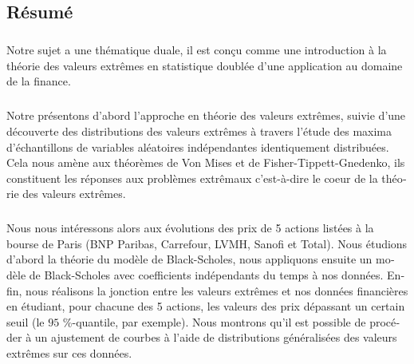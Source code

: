 \begin{otherlanguage}{french}
\cleardoublepage
\chapter*{Résumé}
\bigskip
\paragraph{}
Notre sujet a une thématique duale, il est con\c cu comme une introduction à la théorie des valeurs extrêmes en statistique doublée d'une application au domaine de la finance.
\paragraph{}
Notre présentons d'abord l'approche en théorie des valeurs extrêmes, suivie d'une découverte des distributions des valeurs extrêmes à travers l'étude des maxima d'échantillons de variables aléatoires indépendantes identiquement distribuées. Cela nous amène aux théorèmes de Von Mises et de Fisher-Tippett-Gnedenko, ils constituent les réponses aux problèmes extrêmaux c'est-à-dire le coeur de la théorie des valeurs extrêmes.
\paragraph{}
Nous nous intéressons alors aux évolutions des prix de 5 actions listées à la bourse de Paris (BNP Paribas, Carrefour, LVMH, Sanofi et Total). Nous étudions d'abord la théorie du modèle de Black-Scholes, nous appliquons ensuite un modèle de Black-Scholes avec coefficients indépendants du temps à nos données. Enfin, nous réalisons la jonction entre les valeurs extrêmes et nos données financières en étudiant, pour chacune des 5 actions, les valeurs des prix dépassant un certain seuil (le $95$ \%-quantile, par exemple). Nous montrons qu'il est possible de procéder à un ajustement de courbes à l'aide de distributions généralisées des valeurs extrêmes sur ces données.
\vskip0.5cm
\end{otherlanguage}


